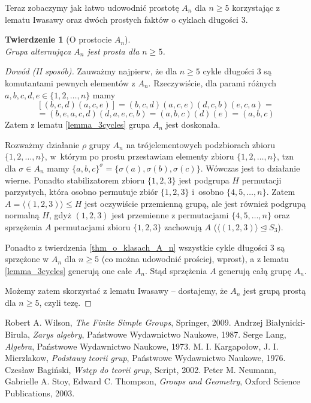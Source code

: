\documentclass[licencjacka]{pracamgr}
\newtheorem{thh}{Twierdzenie}[section]
\begin{document}
Teraz zobaczymy jak łatwo udowodnić prostotę $A_n$ dla $n \ge 5$ korzystając z lematu Iwasawy 
oraz dwóch prostych faktów o cyklach długości 3.

\addtocounter{chapter}{-2}
\begin{thh}[O prostocie $A_n$] $ $ \\
    Grupa alternująca $A_n$ jest prosta dla $n \ge 5$.
\end{thh}
\begin{proof}[Dowód (II sposób)]
  Zauważmy najpierw, że dla $n \ge 5$ cykle długości 3 są komutantami pewnych elementów z $A_n$.
  Rzeczywiście, dla parami różnych $a, b, c, d, e \in \{ 1, 2, \ldots, n \}$ mamy
  $$ [(b, c, d)(a, c, e)] = (b, c, d)(a, c, e)(d, c, b)(e, c, a) = $$
  $$ = (b, e, a, c, d)(d, a, e, c, b) = (a, b, c)(d)(e) = (a, b, c)$$
  Zatem z lematu \ref{lemma_3cycles} grupa $A_n$ jest doskonała.

  Rozważmy działanie $\rho$ grupy $A_n$ na trójelementowych podzbiorach zbioru $\{ 1, 2, \ldots, n \}$,
  w~którym po prostu przestawiam elementy zbioru $\{1, 2, \ldots, n\}$, 
  tzn dla $\sigma \in A_n$ mamy $\{a, b, c \}^\sigma = \{ \sigma(a), \sigma(b), \sigma(c) \}$.
  Wówczas jest to działanie wierne.
  Ponadto stabilizatorem zbioru $\{1, 2, 3\}$ jest podgrupa $H$ permutacji parzystych, 
  która osobno permutuje zbiór $\{1, 2, 3\}$ i~osobno $\{4, 5, \ldots, n\}$.
  Zatem $A =  \langle (1, 2, 3)  \rangle \le H$ jest oczywiście przemienną grupą,
  ale jest również podgrupą normalną $H$, gdyż $(1, 2, 3)$ jest przemienne z permutacjami $\{4, 5, \ldots, n\}$
  oraz sprzężenia $A$ permutacjami zbioru $\{1, 2, 3\}$ zachowują $A$ ($\langle (1, 2, 3)  \rangle \unlhd S_3$).
  
  Ponadto z twierdzenia \ref{thm_o_klasach_A_n} wszystkie cykle długości 3 są sprzężone w $A_n$ dla $n \ge 5$
  (co można udowodnić prościej, wprost), a z lematu \ref{lemma_3cycles} generują one całe $A_n$.
  Stąd sprzężenia $A$ generują całą grupę $A_n$.

  Możemy zatem skorzystać z lematu Iwasawy -- dostajemy, że $A_n$ jest grupą prostą dla $n \ge 5$, czyli tezę.
\end{proof}


\addtocounter{chapter}{2}


\begin{thebibliography}{99}

 Robert A. Wilson, \textit{The Finite Simple Groups}, Springer, 2009.
 Andrzej Białynicki-Birula, \textit{Zarys algebry}, Państwowe Wydawnictwo Naukowe, 1987.
 Serge Lang, \textit{Algebra}, Państwowe Wydawnictwo Naukowe, 1973.
 M. I. Kargapołow, J. I. Mierzlakow, \textit{Podstawy teorii grup}, Państwowe Wydawnictwo Naukowe, 1976.
 Czesław Bagiński, \textit{Wstęp do teorii grup}, Script, 2002.
 Peter M. Neumann, Gabrielle A. Stoy, Edward C. Thompson, \textit{Groups and Geometry}, Oxford Science Publications, 2003.

\end{thebibliography}
\end{document}
